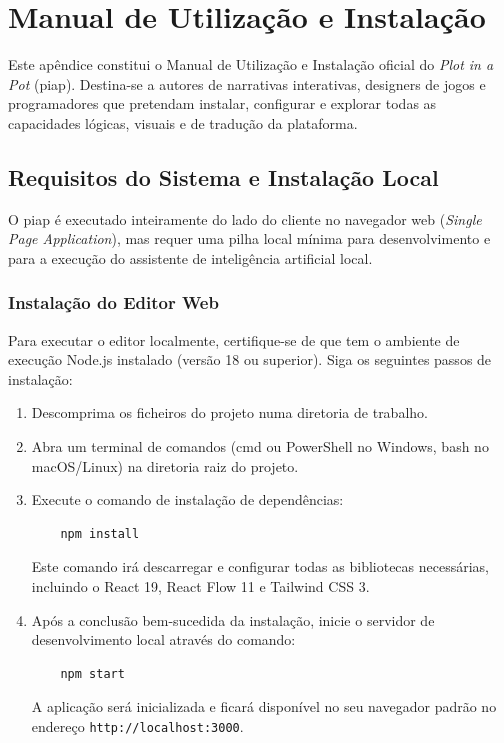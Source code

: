 \chapter{Manual de Utilização e Instalação}
\label{ap:manual-utilizador}

Este apêndice constitui o Manual de Utilização e Instalação oficial do \textit{Plot in a Pot} (\gls{piap}). Destina-se a autores de narrativas interativas, designers de jogos e programadores que pretendam instalar, configurar e explorar todas as capacidades lógicas, visuais e de tradução da plataforma.

\section{Requisitos do Sistema e Instalação Local}
O \gls{piap} é executado inteiramente do lado do cliente no navegador web (\textit{Single Page Application}), mas requer uma pilha local mínima para desenvolvimento e para a execução do assistente de inteligência artificial local.

\subsection{Instalação do Editor Web}
Para executar o editor localmente, certifique-se de que tem o ambiente de execução Node.js instalado (versão 18 ou superior). Siga os seguintes passos de instalação:
\begin{enumerate}
    \item Descomprima os ficheiros do projeto numa diretoria de trabalho.
    \item Abra um terminal de comandos (cmd ou PowerShell no Windows, bash no macOS/Linux) na diretoria raiz do projeto.
    \item Execute o comando de instalação de dependências:
    \begin{verbatim}
    npm install
    \end{verbatim}
    Este comando irá descarregar e configurar todas as bibliotecas necessárias, incluindo o React 19, React Flow 11 e Tailwind CSS 3.
    \item Após a conclusão bem-sucedida da instalação, inicie o servidor de desenvolvimento local através do comando:
    \begin{verbatim}
    npm start
    \end{verbatim}
    A aplicação será inicializada e ficará disponível no seu navegador padrão no endereço \texttt{http://localhost:3000}.
\end{enumerate}

